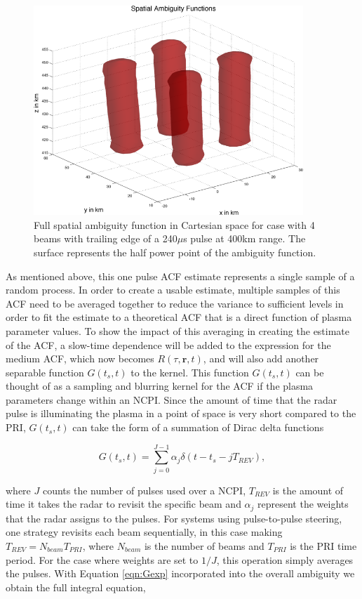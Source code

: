 \begin{figure}
	\centering
	\includegraphics[width=4in]{spaceamb}
	\caption{Full spatial ambiguity function in Cartesian space for case with 4 beams with trailing edge of a 240$\mu$s pulse at 400km range. The surface represents the half power point of the ambiguity function.}	
	\label{fig:amb4}
\end{figure}

As mentioned above, this one pulse ACF estimate represents a single sample of a random process. In order to create a usable estimate, multiple samples of this ACF need to be averaged together to reduce the variance to sufficient levels in order to fit the estimate to a theoretical ACF that is a direct function of plasma parameter values. To show the impact of this averaging in creating the estimate of the ACF, a slow-time dependence will be added to the expression for the medium ACF, which now becomes $R(\tau,\mathbf{r},t)$, and will also add another separable function $G(t_s,t)$ to the kernel. This function $G(t_s,t)$ can be thought of as a sampling and blurring kernel for the ACF if the plasma parameters change within an NCPI. Since the amount of time that the radar pulse is illuminating the plasma in a point of space is very short compared to the PRI, $G(t_s,t)$ can take the form of a summation of Dirac delta functions 

\begin{equation}
\label{eqn:Gexp}
G(t_s,t) = \displaystyle \sum_{j=0}^{J-1}\alpha_j \delta(t-t_s-jT_{REV}),
\end{equation}

\noindent where $J$ counts the number of pulses used over a NCPI, $T_{REV}$ is the amount of time it takes the radar to revisit the specific beam and $\alpha_j$ represent the weights that the radar assigns to the pulses. For systems using pulse-to-pulse steering, one strategy revisits each beam sequentially, in this case making $T_{REV}=N_{beam}T_{PRI}$, where $N_{beam}$ is the number of beams and $T_{PRI}$ is the PRI time period. For the case where weights are set to $1/J$, this operation simply averages the pulses. With Equation \ref{eqn:Gexp} incorporated into the overall ambiguity we obtain the full integral equation,

